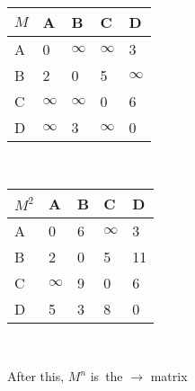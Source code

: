 \begin{minipage}{0.48\textwidth}

    \centering
    \begin{tabular}{|l|l|l|l|l|}
      \hline

      $M$ & A        & B        & C        & D        \\ \hline
      A   & 0        & $\infty$ & $\infty$ & 3        \\ \hline
      B   & 2        & 0        & 5        & $\infty$ \\ \hline
      C   & $\infty$ & $\infty$ & 0        & 6        \\ \hline
      D   & $\infty$ & 3        & $\infty$ & 0        \\ \hline
    \end{tabular}
  \end{minipage}

  \,\begin{minipage}{0.48\textwidth}

    \centering
    \begin{tabular}{|l|l|l|l|l|}
      \hline

      $M^2$ & A        & B & C        & D  \\ \hline
      A     & 0        & 6 & $\infty$ & 3  \\ \hline
      B     & 2        & 0 & 5        & 11 \\ \hline
      C     & $\infty$ & 9 & 0        & 6  \\ \hline
      D     & 5        & 3 & 8        & 0  \\ \hline
    \end{tabular}
  \end{minipage}\,

  After this, $M^n$ is \,the $\rightarrow$ matrix\,